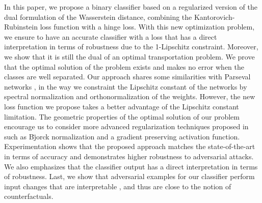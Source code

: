 \documentclass{article}
\begin{document}
In this paper, we propose a binary classifier based on a regularized version of the dual formulation of the Wasserstein distance, combining the Kantorovich-Rubinstein loss function with a hinge loss. With this new optimization problem, we ensure to have an accurate classifier with a loss that has a direct interpretation in terms of robustness due to the 1-Lipschitz constraint. Moreover, we show that it is still the dual of an optimal transportation problem. We prove that the optimal solution of the problem exists and makes no error when the classes are well separated. Our approach shares some similarities with Parseval networks \cite{cisse_parseval_2017}, in the way we constraint the Lipschitz constant of the networks by spectral normalization and orthonormalization of the weights. However, the new loss function we propose takes a better advantage of the Lipschitz constant limitation. The geometric properties of the optimal solution of our problem encourage us to consider more advanced regularization techniques proposed in \cite{pmlr-v97-anil19a} such as B\"jorck normalization and a gradient preserving activation function. Experimentation shows that the proposed approach  matches the state-of-the-art in terms
of accuracy and demonstrates higher robustness to adversarial attacks. We also emphasizes that the classifier output has a direct interpretation in terms of robustness.
Last, we show that adversarial examples for our classifier perform input changes that are interpretable %
, and thus are close to the notion of counterfactuals. 
\end{document}
